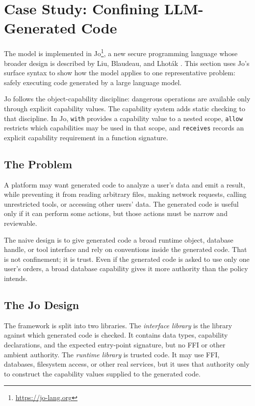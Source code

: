 
\section{Case Study: Confining LLM-Generated Code}
\label{sec:cases}

The model is implemented in Jo\footnote{\url{https://jo-lang.org}}, a new
secure programming language whose broader design is described by Liu,
Blaudeau, and Lhot\'ak \cite{liu-jo-design}. %
This section uses Jo's surface syntax to show how the model applies to one
representative problem: safely executing code generated by a large language
model. %

Jo follows the object-capability discipline: dangerous operations are available
only through explicit capability values. %
The capability system adds static checking to that discipline. %
In Jo, \texttt{with} provides a capability value to a nested scope,
\texttt{allow} restricts which capabilities may be used in that scope, and
\texttt{receives} records an explicit capability requirement in a function
signature. %

\subsection{The Problem}

A platform may want generated code to analyze a user's data and emit a result,
while preventing it from reading arbitrary files, making network requests,
calling unrestricted tools, or accessing other users' data. %
The generated code is useful only if it can perform some actions, but those
actions must be narrow and reviewable. %

The naive design is to give generated code a broad runtime object, database
handle, or tool interface and rely on conventions inside the generated code. %
That is not confinement; it is trust. %
Even if the generated code is asked to use only one user's orders, a broad
database capability gives it more authority than the policy intends. %

\subsection{The Jo Design}

The framework is split into two libraries. %
The \emph{interface library} is the library against which generated code is
checked. %
It contains data types, capability declarations, and the expected entry-point
signature, but no FFI or other ambient authority. %
The \emph{runtime library} is trusted code. %
It may use FFI, databases, filesystem access, or other real services, but it
uses that authority only to construct the capability values supplied to the
generated code. %

